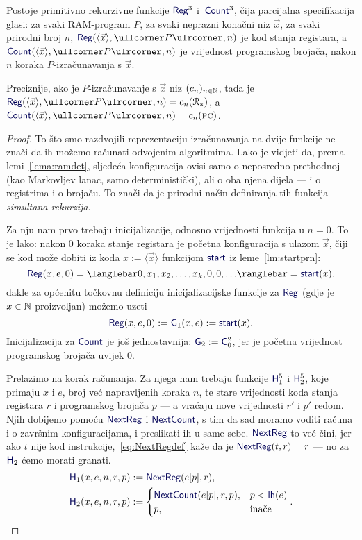 \begin{lema}\label{lm:RegCountprn}
Postoje primitivno rekurzivne funkcije $\f{Reg}^3$ i\, $\f{Count}^3$, čija parcijalna specifikacija glasi:
za svaki RAM-program $P$, za svaki neprazni konačni niz $\vec x$, za svaki prirodni broj $n$, $\f{Reg}(\langle \vec x\rangle,\kprog{P},n)$ je kod stanja registara, a $\f{Count}(\langle \vec x\rangle,\kprog{P},n)$ je vrijednost programskog brojača, nakon $n$ koraka $P$-izračunavanja s $\vec x$.
\end{lema}
Preciznije, ako je $P$-izračunavanje s $\vec x$ niz $(c_n)_{n\in{\mathbb N}}$, tada je $\f{Reg}(\langle\vec x\rangle, \kprog{P},n)=c_n(\reg{*})$, a $\f{Count}(\langle\vec x\rangle,\kprog{P},n)=c_n(\textsc{pc})$.
\begin{proof}
To što smo razdvojili reprezentaciju izračunavanja na dvije funkcije ne znači da ih možemo računati odvojenim algoritmima. Lako je vidjeti da, prema lemi~\ref{lema:ramdet}, sljedeća konfiguracija ovisi samo o neposredno prethodnoj (kao Markovljev lanac, samo deterministički), ali o oba njena dijela --- i o registrima i o brojaču. To znači da je prirodni način definiranja tih funkcija \emph{simultana rekurzija}.

Za nju nam prvo trebaju inicijalizacije, odnosno vrijednosti funkcija u $n=0$. To je lako: nakon $0$ koraka stanje registara je početna konfiguracija s ulazom $\vec x$, čiji se kod može dobiti iz koda $x:=\langle\vec x\rangle$ funkcijom $\f{start}$ iz leme~\ref{lm:startprn}:
\begin{equation}
    \f{Reg}(x,e,0)=\knk{0,x_1,x_2,\dotsc,x_k,0,0,\dotsc}=\f{start}(x)\text,
\end{equation}
dakle za općenitu točkovnu definiciju inicijalizacijske funkcije za $\f{Reg}$ (gdje je $x\in{\mathbb N}$ proizvoljan) možemo uzeti
\begin{equation}
    \f{Reg}(x,e,0):=\f G_1(x,e):=\f{start}(x)\text.
\end{equation}
Inicijalizacija za $\f{Count}$ je još jednostavnija: $\f G_2:=\f C_0^2$, jer je početna vrijednost programskog brojača uvijek $0$.

Prelazimo na korak računanja. Za njega nam trebaju funkcije $\f H_1^5$ i $\f H_2^5$, koje primaju $x$ i $e$, broj već napravljenih koraka $n$, te stare vrijednosti koda stanja registara $r$ i programskog brojača $p$ --- a vraćaju nove vrijednosti $r'$ i $p'$ redom. Njih dobijemo pomoću $\f{NextReg}$ i $\f{NextCount}$, s tim da sad moramo voditi računa i o završnim konfiguracijama, i preslikati ih u same sebe. $\f{NextReg}$ to već čini, jer ako $t$ nije kod instrukcije,~\eqref{eq:NextRegdef} kaže da je $\f{NextReg}(t,r)=r$ --- no za $\f H_2$ ćemo morati granati.
\begin{align}
    \f H_1(x,e,n,r,p)&:=\f{NextReg}(e[p],r)\text,\\
    \f H_2(x,e,n,r,p)&:=\begin{cases}
        \f{NextCount}(e[p],r,p),&
        p<\f{lh}(e)\\
        p,&\text{inače}
    \end{cases}\text.
\end{align}


\end{proof}
